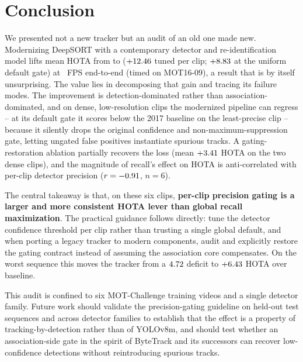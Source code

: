 \section{Conclusion}
\label{sec:conclusion}

We presented not a new tracker but an audit of an old one made new. Modernizing DeepSORT with a
contemporary detector and re-identification model lifts mean HOTA from \baselineHOTA{} to
\modernHOTA{} ($+12.46$ tuned per clip; $+8.83$ at the uniform default gate) at
\fpsRealtime{}~FPS end-to-end (timed on MOT16-09), a result that is by
itself unsurprising. The value lies in decomposing that gain and tracing its failure modes. The
improvement is detection-dominated rather than association-dominated, and on dense, low-resolution
clips the modernized pipeline can regress -- at its default gate it scores below the 2017 baseline on
the least-precise clip -- because it silently drops the original confidence and non-maximum-suppression
gate, letting ungated false positives instantiate spurious tracks. A gating-restoration ablation
partially recovers the loss (mean $+3.41$ HOTA on the two dense clips), and the magnitude of
recall's effect on HOTA is anti-correlated with per-clip detector precision ($r = -0.91$, $n=6$).

The central takeaway is that, on these six clips, \textbf{per-clip precision gating is a
larger and more consistent HOTA lever than global recall maximization}. The practical guidance
follows directly: tune the detector confidence threshold per clip rather than trusting a single
global default, and when porting a legacy tracker to modern components, audit and explicitly
restore the gating contract instead of assuming the association core compensates. On the worst
sequence this moves the tracker from a $4.72$ deficit to $+6.43$ HOTA over baseline.

This audit is confined to six MOT-Challenge training videos and a single detector family. Future
work should validate the precision-gating guideline on held-out test sequences and across detector
families to establish that the effect is a property of tracking-by-detection rather than of
YOLOv8m, and should test whether an association-side gate in the spirit of ByteTrack and its
successors can recover low-confidence detections without reintroducing spurious tracks.
